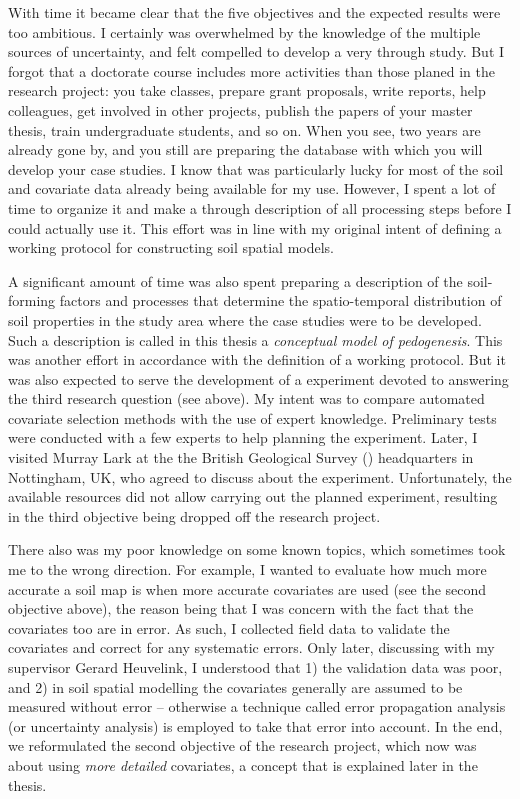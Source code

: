 With time it became clear that the five objectives and the expected results were too ambitious. I certainly 
was overwhelmed by the knowledge of the multiple sources of uncertainty, and felt compelled to develop a very 
through study. But I forgot that a doctorate course includes more activities than those planed in the 
research project: you take classes, prepare grant proposals, write reports, help colleagues, get involved in 
other projects, publish the papers of your master thesis, train undergraduate students, and so on. When you 
see, two years are already gone by, and you still are preparing the database with which you will develop your 
case studies. I know that was particularly lucky for most of the soil and covariate data already being 
available for my use. However, I spent a lot of time to organize it and make a through description of all 
processing steps before I could actually use it. This effort was in line with my original intent of 
defining a working protocol for constructing soil spatial models.

A significant amount of time was also spent preparing a description of the soil-forming factors and processes
that determine the spatio-temporal distribution of soil properties in the study area where the case studies 
were to be developed. Such a description is called in this thesis a \emph{conceptual model of pedogenesis}. 
This was another effort in accordance with the definition of a working protocol. But it was also expected to 
serve the development of a experiment devoted to answering the third research question (see above). My intent 
was to compare automated covariate selection methods with the use of expert knowledge. Preliminary tests were 
conducted with a few experts to help planning the experiment. Later, I visited Murray Lark at the the British 
Geological Survey (\bgs) headquarters in Nottingham, UK, who agreed to discuss about the experiment. 
Unfortunately, the available resources did not allow carrying out the planned experiment, resulting in the 
third objective being dropped off the research project.

There also was my poor knowledge on some known topics, which sometimes took me to the wrong direction. For 
example, I wanted to evaluate how much more accurate a soil map is when more accurate covariates are used 
(see the second objective above), the reason being that I was concern with the fact that the covariates too 
are in error. As such, I collected field data to validate the covariates and correct for any systematic 
errors. Only later, discussing with my supervisor Gerard Heuvelink, I understood that 1) the validation data 
was poor, and 2) in soil spatial modelling the covariates generally are assumed to be measured without error 
-- otherwise a technique called error propagation analysis (or uncertainty analysis) is employed to take that 
error into account. In the end, we reformulated the second objective of the research project, which now was 
about using \emph{more detailed} covariates, a concept that is explained later in the thesis.

